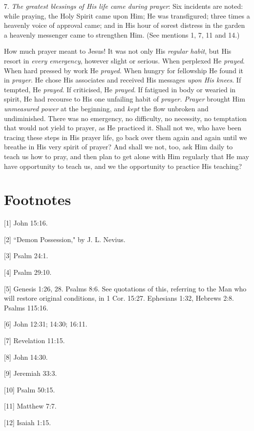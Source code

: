 7. \textit{The greatest blessings of His life came during prayer}: Six incidents
are noted: while praying, the Holy Spirit came upon Him; He was
transfigured; three times a heavenly voice of approval came; and in His
hour of sorest distress in the garden a heavenly messenger came to
strengthen Him. (See mentions 1, 7, 11 and 14.)

How much prayer meant to Jesus! It was not only His \textit{regular habit}, but
His resort in \textit{every emergency}, however slight or serious. When perplexed
He \textit{prayed}. When hard pressed by work He \textit{prayed}. When hungry for
fellowship He found it in \textit{prayer}. He chose His associates and received
His messages \textit{upon His knees}. If tempted, He \textit{prayed}. If criticised, He
\textit{prayed}. If fatigued in body or wearied in spirit, He had recourse to His
one unfailing habit of \textit{prayer. Prayer} brought Him \textit{unmeasured power} at
the beginning, and \textit{kept} the flow unbroken and undiminished. There was no
emergency, no difficulty, no necessity, no temptation that would not yield
to prayer, as He practiced it. Shall not we, who have been tracing these
steps in His prayer life, go back over them again and again until we
breathe in His very spirit of prayer? And shall we not, too, ask Him daily
to teach us how to pray, and then plan to get alone with Him regularly
that He may have opportunity to teach us, and we the opportunity to
practice His teaching?


\chapter{Footnotes}

[1] John 15:16.

[2] ``Demon Possession," by J. L. Nevius.

[3] Psalm 24:1.

[4] Psalm 29:10.

[5] Genesis 1:26, 28. Psalms 8:6. See quotations of this, referring to the
Man who will restore original conditions, in 1 Cor. 15:27. Ephesians 1:32,
Hebrews 2:8. Psalms 115:16.

[6] John 12:31; 14:30; 16:11.

[7] Revelation 11:15.

[8] John 14:30.

[9] Jeremiah 33:3.

[10] Psalm 50:15.

[11] Matthew 7:7.

[12] Isaiah 1:15.


